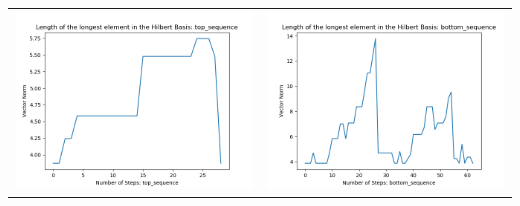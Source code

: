 \documentclass[10pt]{article}
\begin{document}
\begin{tabular}{c|c}
\begin{minipage}{.4\textwidth}
\includegraphics[width=\textwidth]{"DATA/4d/5 generators 2 bound F/top_sequence LENGTH"}
\end{minipage} &
\begin{minipage}{.4\textwidth}
\includegraphics[width=\textwidth]{"DATA/4d/5 generators 2 bound F bottomup/bottom_sequence LENGTH"}
\end{minipage}
\end{tabular}
\end{document}
